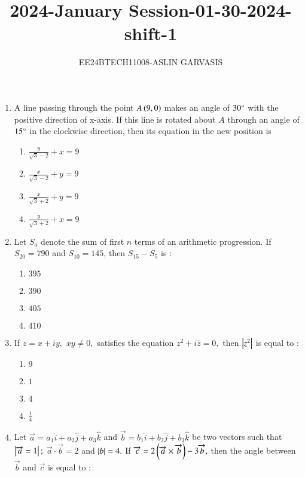 \documentclass[journal,12pt,twocolumn]{IEEEtran}
\theoremstyle{remark}
\begin{document}

\vspace{3cm}
\title{2024-January Session-01-30-2024-shift-1}
\author{EE24BTECH11008-ASLIN GARVASIS}
\maketitle
\begin{enumerate}
    \item A line passing through the point $A\left(9,0\right)$ makes an angle of $30\degree$ with the positive direction of x-axis. If this line is rotated about $A$ through an angle of $15\degree$ in the clockwise direction, then its equation in the new position is\\
    \begin{enumerate}
        \item $\frac{y}{\sqrt{3}-2}+x=9$
        \item $\frac{x}{\sqrt{3}-2}+y=9$
        \item $\frac{x}{\sqrt{3}+2}+y=9$
        \item $\frac{y}{\sqrt{3}+2}+x=9$
    \end{enumerate}
    \item Let $S_a$ denote the sum of first $n$ terms of an arithmetic progression. If $S_{20}=790$ and $S_{10}=145$, then $S_{15}-S_5$ is $:$\\
    \begin{enumerate}
        \item $395$
        \item $390$
        \item $405$
        \item $410$
    \end{enumerate}
    \item If $z = x + iy,$ $xy\neq 0,$ satisfies the equation $z^2+i\overline{z}=0,$ then $\left\vert z^2\right\vert$ is equal to $:$\\
    \begin{enumerate}
        \item $9$
        \item $1$
        \item $4$
        \item $\frac{1}{4}$
    \end{enumerate}
    \item Let $\overrightarrow{a}=a_1\hat{i}+a_2\hat{j}+a_3\hat{k}$ and $\overrightarrow{b}=b_1\hat{i}+b_2\hat{j}+b_3\hat{k}$ be two vectors such that $\left\vert\overrightarrow{a}=1\right\vert;$ $\overrightarrow{a}\cdot\overrightarrow{b}=2$ and $\left\vert b\right\vert=4.$ If $\overrightarrow{c}=2\left(\overrightarrow{a}\times\overrightarrow{b}\right)-3\overrightarrow{b},$ then the angle between $\overrightarrow{b}$ and $\overrightarrow{c}$ is equal to $:$\\

\end{enumerate}
\end{document}
